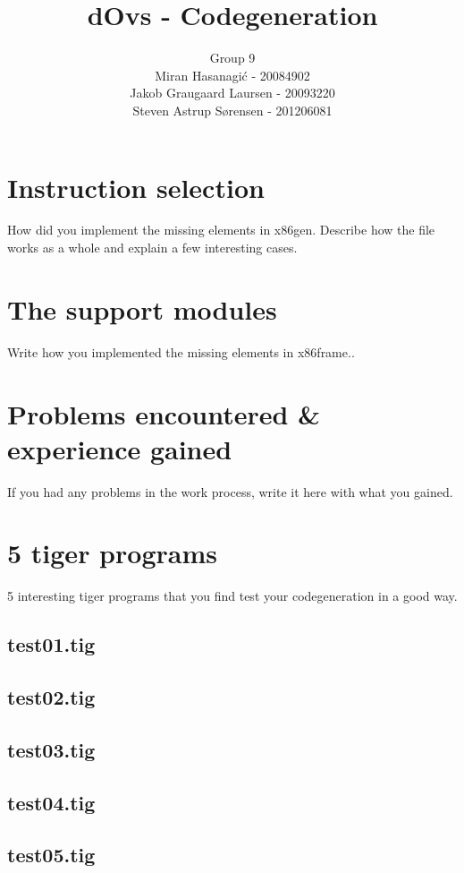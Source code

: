 \documentclass{article}
\title{dOvs - Codegeneration}
\author{
  Group 9 \\
  Miran Hasanagi\'{c} - 20084902 \\
  Jakob Graugaard Laursen - 20093220\\
  Steven Astrup S\o rensen - 201206081
}
\begin{document}
\maketitle

\section{Instruction selection}
How did you implement the missing elements in x86gen. Describe how the file works as a whole and explain a few interesting cases.

\section{The support modules}
Write how you implemented the missing elements in x86frame..

\section{Problems encountered \& experience gained}
If you had any problems in the work process, write it here with what you gained.

\section{5 tiger programs}
5 interesting tiger programs that you find test your codegeneration in a good way.

\subsection{test01.tig}



\subsection{test02.tig}





\subsection{test03.tig}



\subsection{test04.tig}



\subsection{test05.tig}


\end{document}
